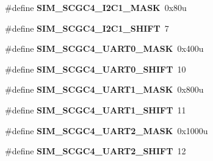 \begin{DoxyCompactItemize}
\item 
\hypertarget{group___s_i_m___register___masks_gad28d1d702a535531373c915824c34793}{}\#define {\bfseries S\+I\+M\+\_\+\+S\+C\+G\+C4\+\_\+\+I2\+C1\+\_\+\+M\+A\+S\+K}~0x80u\label{group___s_i_m___register___masks_gad28d1d702a535531373c915824c34793}

\item 
\hypertarget{group___s_i_m___register___masks_ga9f7b3fb0b1b7843cdf821b6b9a86ecfb}{}\#define {\bfseries S\+I\+M\+\_\+\+S\+C\+G\+C4\+\_\+\+I2\+C1\+\_\+\+S\+H\+I\+F\+T}~7\label{group___s_i_m___register___masks_ga9f7b3fb0b1b7843cdf821b6b9a86ecfb}

\item 
\hypertarget{group___s_i_m___register___masks_ga8fc8faeefc38393c83454ceba120d5df}{}\#define {\bfseries S\+I\+M\+\_\+\+S\+C\+G\+C4\+\_\+\+U\+A\+R\+T0\+\_\+\+M\+A\+S\+K}~0x400u\label{group___s_i_m___register___masks_ga8fc8faeefc38393c83454ceba120d5df}

\item 
\hypertarget{group___s_i_m___register___masks_gae3407d4e1676ac6654898712335842b0}{}\#define {\bfseries S\+I\+M\+\_\+\+S\+C\+G\+C4\+\_\+\+U\+A\+R\+T0\+\_\+\+S\+H\+I\+F\+T}~10\label{group___s_i_m___register___masks_gae3407d4e1676ac6654898712335842b0}

\item 
\hypertarget{group___s_i_m___register___masks_ga24a3ebc9f4c6154041b1a39b33f3c121}{}\#define {\bfseries S\+I\+M\+\_\+\+S\+C\+G\+C4\+\_\+\+U\+A\+R\+T1\+\_\+\+M\+A\+S\+K}~0x800u\label{group___s_i_m___register___masks_ga24a3ebc9f4c6154041b1a39b33f3c121}

\item 
\hypertarget{group___s_i_m___register___masks_ga2eda3e80bcf9a5ee77ce321d86cd92d0}{}\#define {\bfseries S\+I\+M\+\_\+\+S\+C\+G\+C4\+\_\+\+U\+A\+R\+T1\+\_\+\+S\+H\+I\+F\+T}~11\label{group___s_i_m___register___masks_ga2eda3e80bcf9a5ee77ce321d86cd92d0}

\item 
\hypertarget{group___s_i_m___register___masks_gaea7b7b8d6abc055026d4ca7299206597}{}\#define {\bfseries S\+I\+M\+\_\+\+S\+C\+G\+C4\+\_\+\+U\+A\+R\+T2\+\_\+\+M\+A\+S\+K}~0x1000u\label{group___s_i_m___register___masks_gaea7b7b8d6abc055026d4ca7299206597}

\item 
\hypertarget{group___s_i_m___register___masks_gae844b2ce3371466add7387b9ea32bc4c}{}\#define {\bfseries S\+I\+M\+\_\+\+S\+C\+G\+C4\+\_\+\+U\+A\+R\+T2\+\_\+\+S\+H\+I\+F\+T}~12\label{group___s_i_m___register___masks_gae844b2ce3371466add7387b9ea32bc4c}


\end{DoxyCompactItemize}
